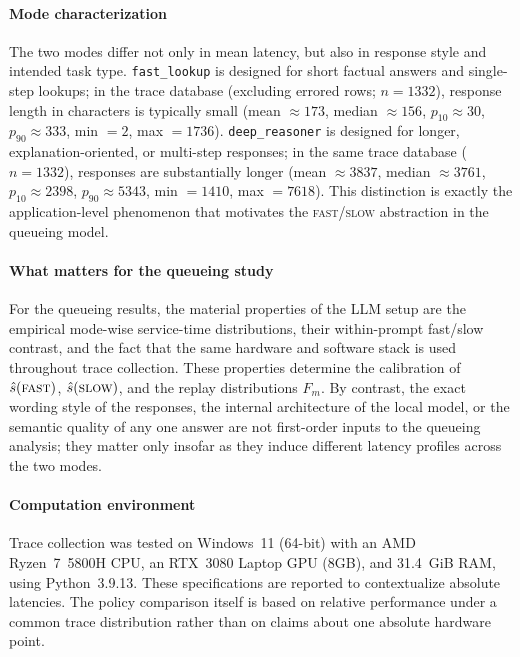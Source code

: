 \documentclass[preprint,12pt]{elsarticle}
\begin{document}
\paragraph{Mode characterization}
The two modes differ not only in mean latency, but also in response style and intended task type. \texttt{fast\_lookup} is designed for short factual answers and single-step lookups; in the trace database (excluding errored rows; $n=1332$), response length in characters is typically small (mean $\approx 173$, median $\approx 156$, $p_{10}\approx 30$, $p_{90}\approx 333$, min $=2$, max $=1736$). \texttt{deep\_reasoner} is designed for longer, explanation-oriented, or multi-step responses; in the same trace database ($n=1332$), responses are substantially longer (mean $\approx 3837$, median $\approx 3761$, $p_{10}\approx 2398$, $p_{90}\approx 5343$, min $=1410$, max $=7618$). This distinction is exactly the application-level phenomenon that motivates the \textsc{fast}/\textsc{slow} abstraction in the queueing model.

\paragraph{What matters for the queueing study}
For the queueing results, the material properties of the LLM setup are the empirical mode-wise service-time distributions, their within-prompt fast/slow contrast, and the fact that the same hardware and software stack is used throughout trace collection. These properties determine the calibration of $\hat{s}(\textsc{fast})$, $\hat{s}(\textsc{slow})$, and the replay distributions $F_m$. By contrast, the exact wording style of the responses, the internal architecture of the local model, or the semantic quality of any one answer are not first-order inputs to the queueing analysis; they matter only insofar as they induce different latency profiles across the two modes.

\paragraph{Computation environment}
Trace collection was tested on Windows~11 (64-bit) with an AMD Ryzen~7~5800H CPU, an RTX~3080 Laptop GPU (8GB), and 31.4~GiB RAM, using Python~3.9.13. These specifications are reported to contextualize absolute latencies. The policy comparison itself is based on relative performance under a common trace distribution rather than on claims about one absolute hardware point.
\end{document}
